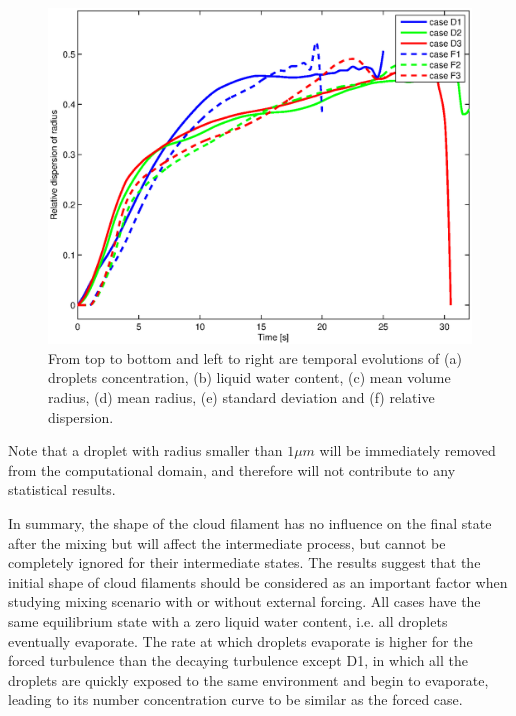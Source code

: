 \begin{figure}[!htbp]
\includegraphics[width=0.48\linewidth]{Figures/dsp_radius}
\caption{From top to bottom and left to right are temporal evolutions of (a) droplets concentration, (b) liquid water content, (c) mean volume radius, (d) mean radius, (e) standard deviation and (f) relative dispersion.}\label{fig:temporal_variation} 
\end{figure}

Note that a droplet with radius smaller than $1\mu m$ will be immediately removed from the computational domain, and therefore will not contribute to any statistical results.

In summary, the shape of the cloud filament has no influence on the final state after the mixing but will affect the intermediate process, but cannot be completely ignored for their intermediate states. The results suggest that the initial shape of cloud filaments should be considered as an important factor when studying mixing scenario with or without external forcing. All cases have the same equilibrium state with a zero liquid water content, i.e. all droplets eventually evaporate. The rate at which droplets evaporate is higher for the forced turbulence than the decaying turbulence except D1, in which all the droplets are quickly exposed to the same environment and begin to evaporate, leading to its number concentration curve to be similar as the forced case.

